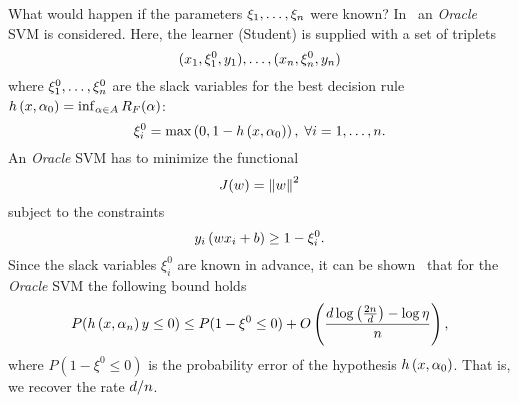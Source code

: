 What would happen if the parameters $\xi_1, \ldots, \xi_n$ were known?
In~\cite{VapnikI15a} an \emph{Oracle} SVM is considered. Here, the learner (Student) is supplied with a set of triplets
\begin{equation}
    \nonumber
    (x_1, \xi_1^0, y_1), \ldots, (x_n, \xi_n^0, y_n)
\end{equation}
where $\xi^0_1, \ldots, \xi^0_n$ are the slack variables for the best decision rule $h\left(x, \alpha_0\right) = \inf_{\alpha \in A} R_F(\alpha) $:
\begin{equation}
    \nonumber
    \xi_i^0 = \max \left(0, 1 - h\left(x, \alpha_0\right)  \right), \; \forall i = 1, \ldots, n .
\end{equation}
An \emph{Oracle} SVM has to minimize the functional
$$J(w) = \left\lVert w\right\rVert^2$$
subject to the constraints
$$y_i \left( w x_i + b \right) \geq 1 - \xi_i^0 .$$
Since the slack variables $\xi_i^0$ are known in advance, it can be shown~\cite{VapnikV09} that for the \emph{Oracle} SVM the following bound holds
\begin{equation}
    \nonumber
    P(h\left(x, \alpha_n\right) y \leq 0) \leq P(1 - \xi^0 \leq 0) + O\left( \frac{d \log\left(\frac{2n}{d} \right) - \log\eta}{n}  \right) ,
\end{equation}
where $P(1 - \xi^0 \leq 0)$ is the probability error of the hypothesis $h\left(x, \alpha_0\right)$.
That is, we recover the rate $d/n$.

